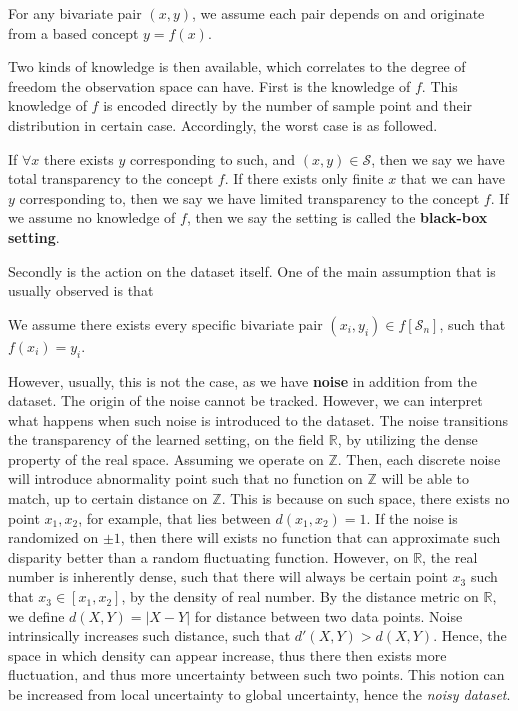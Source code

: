 \documentclass[
  journal=largetwo,
  year=2025,
  volume=37,
]{cup-journal}
\begin{document}
\begin{assumption}[Transparency]
    For any bivariate pair $(x,y)$, we assume each pair depends on and originate from a based concept $y=f(x)$. 
\end{assumption}

Two kinds of knowledge is then available, which correlates to the degree of freedom the observation space can have. First is the knowledge of $f$. This knowledge of $f$ is encoded directly by the number of sample point and their distribution in certain case. Accordingly, the worst case is as followed. 

\begin{conjecture}
    If $\forall x$ there exists $y$ corresponding to such, and $(x,y)\in \mathcal{S}$, then we say we have total transparency to the concept $f$. If there exists only finite $x$ that we can have $y$ corresponding to, then we say we have limited transparency to the concept $f$. If we assume no knowledge of $f$, then we say the setting is called the \textbf{black-box setting}. 
\end{conjecture}

Secondly is the action on the dataset itself. One of the main assumption that is usually observed is that 

\begin{assumption}[Fallacy]
    We assume there exists every specific bivariate pair $(x_{i},y_{i})\in f[\mathcal{S}_{n}]$, such that $f(x_{i})=y_{i}$. 
\end{assumption}

However, usually, this is not the case, as we have \textbf{noise} in addition from the dataset. The origin of the noise cannot be tracked. However, we can interpret what happens when such noise is introduced to the dataset. The noise transitions the transparency of the learned setting, on the field $\mathbb{R}$, by utilizing the dense property of the real space. Assuming we operate on $\mathbb{Z}$. Then, each discrete noise will introduce abnormality point such that no function on $\mathbb{Z}$ will be able to match, up to certain distance on $\mathbb{Z}$. This is because on such space, there exists no point $x_1, x_{2}$, for example, that lies between $d(x_{1},x_{2})=1$. If the noise is randomized on $\pm 1$, then there will exists no function that can approximate such disparity better than a random fluctuating function. However, on $\mathbb{R}$, the real number is inherently dense, such that there will always be certain point $x_{3}$ such that $x_{3}\in [x_{1},x_{2}]$, by the density of real number. By the distance metric on $\mathbb{R}$, we define $d(X,Y)=|X-Y|$ for distance between two data points. Noise intrinsically increases such distance, such that $d'(X,Y)> d(X,Y)$. Hence, the space in which density can appear increase, thus there then exists more fluctuation, and thus more uncertainty between such two points. This notion can be increased from local uncertainty to global uncertainty, hence the \textit{noisy dataset}. 
\end{document}
